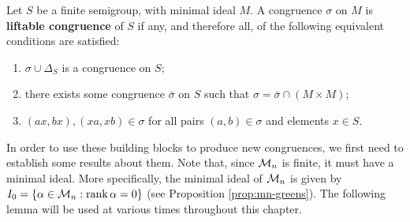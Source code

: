 \begin{definition}
  \label{def:liftable-congruence}
  Let $S$ be a finite semigroup, with minimal ideal $M$.  A congruence $\sigma$
  on $M$ is \textbf{liftable congruence} of $S$ if any, and therefore all, of
  the following equivalent conditions are satisfied:
  \begin{enumerate}[\rm(i)]
  \item $\sigma \cup \Delta_S$ is a congruence on $S$;
  \item there exists some congruence $\bar\sigma$ on $S$ such that
    $\sigma= \bar\sigma \cap (M \times M)$;
  \item $(ax,bx),(xa,xb) \in \sigma$ for all pairs $(a,b) \in \sigma$ and
    elements $x \in S$.
  \end{enumerate}
\end{definition}

In order to use these building blocks to produce new congruences, we first need
to establish some results about them.  Note that, since $\mathcal{M}_n$ is finite, it
must have a minimal ideal.  More specifically, the minimal ideal of $\mathcal{M}_n$ is
given by $I_0 = \{\alpha \in \mathcal{M}_n : \operatorname{rank} \alpha = 0\}$ (see Proposition
\ref{prop:mn-greens}).  The following lemma will be used at various times
throughout this chapter.

